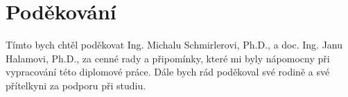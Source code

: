 \thispagestyle{empty}

\null

\vfill

\section*{Poděkování}
Tímto bych chtěl poděkovat Ing. Michalu Schmirlerovi, Ph.D., a doc. Ing. Janu Halamovi, Ph.D., za cenné rady a připomínky, které mi byly nápomocny při vypracování této diplomové práce. Dále bych rád poděkoval své rodině a své přítelkyni za podporu při studiu.
